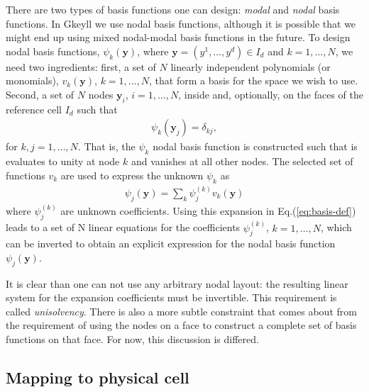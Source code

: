 \documentclass[11pt, reqno]{amsart}
\newcommand{\eqr}[1]{Eq.\thinspace(#1)}
\newcommand{\mvec}[1]{\mathbf{#1}}
\theoremstyle{definition}
\begin{document}
There are two types of basis functions one can design: \emph{modal}
and \emph{nodal} basis functions. In Gkeyll we use nodal basis
functions, although it is possible that we might end up using mixed
nodal-modal basis functions in the future. To design nodal basis
functions, $\psi_k(\mvec{y})$, where $\mvec{y} = (y^1,\ldots,y^d)\in
I_d$ and $k=1,\ldots,N$, we need two ingredients: first, a set of $N$
linearly independent polynomials (or monomials), $v_k(\mvec{y})$,
$k=1,\ldots,N$, that form a basis for the space we wish to
use. Second, a set of $N$ nodes $\mvec{y}_i$, $i=1,\ldots,N$, inside
and, optionally, on the faces of the reference cell $I_d$ such that
\begin{align}
  \psi_k(\mvec{y}_j) = \delta_{kj}, \label{eq:basis-def}
\end{align}
for $k,j=1,\ldots,N$. That is, the $\psi_k$ nodal basis function is
constructed such that is evaluates to unity at node $k$ and vanishes
at all other nodes. The selected set of functions $v_k$ are used to
express the unknown $\psi_k$ as
\begin{align}
  \psi_j(\mvec{y}) = \sum_k \psi^{(k)}_j v_k(\mvec{y})
\end{align}
where $\psi^{(k)}_j$ are unknown coefficients. Using this expansion in
\eqr{\ref{eq:basis-def}} leads to a set of N linear equations for the
coefficients $\psi^{(k)}_j$, $k=1,\ldots,N$, which can be inverted to
obtain an explicit expression for the nodal basis function
$\psi_j(\mvec{y})$.

It is clear than one can not use any arbitrary nodal layout: the
resulting linear system for the expansion coefficients must be
invertible. This requirement is called \emph{unisolvency}. There is
also a more subtle constraint that comes about from the requirement of
using the nodes on a face to construct a complete set of basis
functions on that face. For now, this discussion is differed.

\subsection{Mapping to physical cell}
\end{document}
